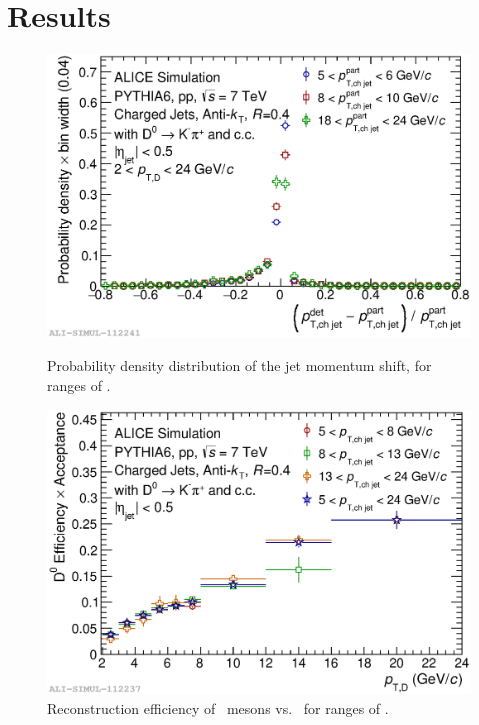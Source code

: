 \documentclass[a4paper]{jpconf}
\begin{document}
\section{Results}

\label{sect:detperf}
\begin{figure}[tb]
\centering
\begin{minipage}{.48\textwidth}
\includegraphics[width=\textwidth]{img/HQ16_Simulation_DetectorResponse}
\caption{\label{fig:HQ16_Simulation_DetectorResponse} Probability density distribution of the jet momentum shift, for ranges of \ptchjet.}
\end{minipage}\hspace{1pc}%
\begin{minipage}{.48\textwidth}
\includegraphics[width=\textwidth]{img/HQ16_Simulation_EfficiencyVsDPt}
\caption{\label{fig:HQ16_Simulation_EfficiencyVsDPt}Reconstruction efficiency of \Dzero\ mesons vs. \ptd\ for ranges of \ptchjet.}
\end{minipage} 
\end{figure}
\end{document}
